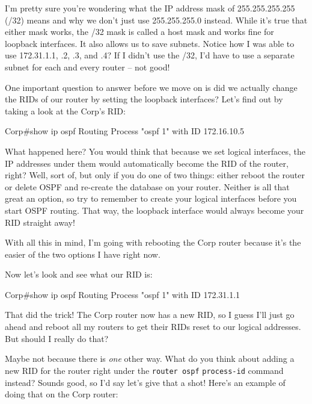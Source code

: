 I'm pretty sure you're wondering what the IP address mask of
255.255.255.255 (/32) means and why we don't just use 255.255.255.0
instead. While it's true that either mask works, the /32 mask is called
a host mask and works fine for loopback interfaces. It also allows us to
save subnets. Notice how I was able to use 172.31.1.1, .2, .3, and .4?
If I didn't use the /32, I'd have to use a separate subnet for each and
every router -- not good!

One important question to answer before we move on is did we actually change the RIDs
of our router by setting the loopback interfaces? Let's find out by
taking a look at the Corp's RID:

\begin{cli}
Corp#show ip ospf
Routing Process "ospf 1" with ID 172.16.10.5
\end{cli}

What happened here? You would think that because we set logical
interfaces, the IP addresses under them would automatically become the
RID of the router, right? Well, sort of, but only if you do one of two
things: either reboot the router or delete OSPF and re-create the
database on your router. Neither is all that great an option, so try to
remember to create your logical interfaces before you start OSPF
routing. That way, the loopback interface would always become your RID
straight away!

With all this in mind, I'm going with rebooting the Corp router because
it's the easier of the two options I have right now.

Now let's look and see what our RID is:

\begin{cli}
Corp#show ip ospf
Routing Process "ospf 1" with ID 172.31.1.1
\end{cli}

That did the trick! The Corp router now has a new RID, so I guess I'll
just go ahead and reboot all my routers to get their RIDs reset to our
logical addresses. But should I really do that?

Maybe not because there is \emph{one} other way. What do you think about
adding a new RID for the router right under the \texttt{router\ ospf}
\texttt{process-id} command instead? Sounds good, so I'd say let's give
that a shot! Here's an example of doing that on the Corp router:

